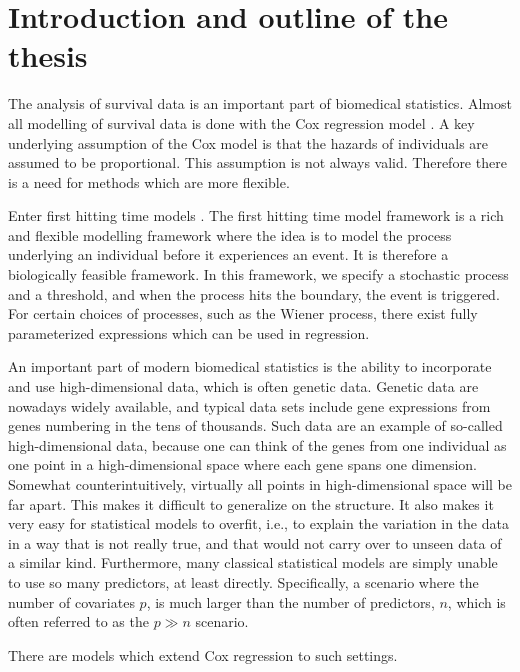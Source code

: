 \chapter{Introduction and outline of the thesis}
\label{sec:intro}
The analysis of survival data is an important part of biomedical statistics.
Almost all modelling of survival data is done with the Cox regression model \citep{cox-model}.
A key underlying assumption of the Cox model is that the hazards of individuals are assumed to be proportional.
This assumption is not always valid.
Therefore there is a need for methods which are more flexible.

Enter first hitting time models \citep{leewhitmore2006}.
The first hitting time model framework is a rich and flexible modelling framework where the idea is to model the process underlying an individual before it experiences an event.
It is therefore a biologically feasible framework.
In this framework, we specify a stochastic process and a threshold, and when the process hits the boundary, the event is triggered.
For certain choices of processes, such as the Wiener process, there exist fully parameterized expressions which can be used in regression.

An important part of modern biomedical statistics is the ability to incorporate and use high-dimensional data, which is often genetic data.
Genetic data are nowadays widely available, and typical data sets include gene expressions from genes numbering in the tens of thousands.
Such data are an example of so-called high-dimensional data, because one can think of the genes from one individual as one point in a high-dimensional space where each gene spans one dimension.
Somewhat counterintuitively, virtually all points in high-dimensional space will be far apart.
This makes it difficult to generalize on the structure.
It also makes it very easy for statistical models to overfit, i.e., to explain the variation in the data in a way that is not really true, and that would not carry over to unseen data of a similar kind.
Furthermore, many classical statistical models are simply unable to use so many predictors, at least directly.
Specifically, a scenario where the number of covariates $p$, is much larger than the number of predictors, $n$, which is often referred to as the $p\gg n$ scenario.

There are models which extend Cox regression to such settings.

